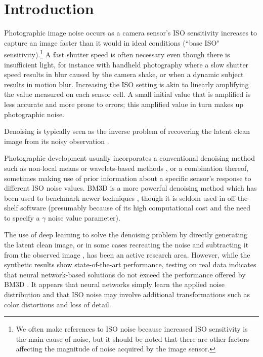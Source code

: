 \chapter{Introduction}\label{chap:Introduction}

Photographic image noise occurs as a camera sensor's ISO sensitivity increases to capture an image faster than it would in ideal conditions (``base ISO" sensitivity).\footnote{We often make references to ISO noise because increased ISO sensitivity is the main cause of noise, but it should be noted that there are other factors affecting the magnitude of noise acquired by the image sensor.} A fast shutter speed is often necessary even though there is insufficient light, for instance with handheld photography where a slow shutter speed results in blur caused by the camera shake, or when a dynamic subject results in motion blur. Increasing the ISO setting is akin to linearly amplifying the value measured on each sensor cell. A small initial value that is amplified is less accurate and more prone to errors; this amplified value in turn makes up photographic noise. 

Denoising is typically seen as the inverse problem of recovering the latent clean image from its noisy observation \cite{rednet}. 

Photographic development usually incorporates a conventional denoising method such as non-local means \cite{nlm} or wavelets-based methods \cite{wavelets-denoising}, or a combination thereof, sometimes making use of prior information about a specific sensor's response to different ISO noise values. \cite{darktable-denoising}
\ac{BM3D} is a more powerful denoising method which has been used to benchmark newer techniques \cite{all-bm3d-benchmarks}, though it is seldom used in off-the-shelf software (presumably because of its high computational cost and the need to specify a $\gamma$ noise value parameter). 

The use of deep learning to solve the denoising problem by directly generating the latent clean image, or in some cases recreating the noise and subtracting it from the observed image \cite{dncnn}, has been an active research area. However, while the synthetic results show state-of-the-art performance, testing on real data indicates that neural network-based solutions do not exceed the performance offered by \ac{BM3D} \cite{darmstadt}. It appears that neural networks simply learn the applied noise distribution and that ISO noise may involve additional transformations such as color distortions and loss of detail.

